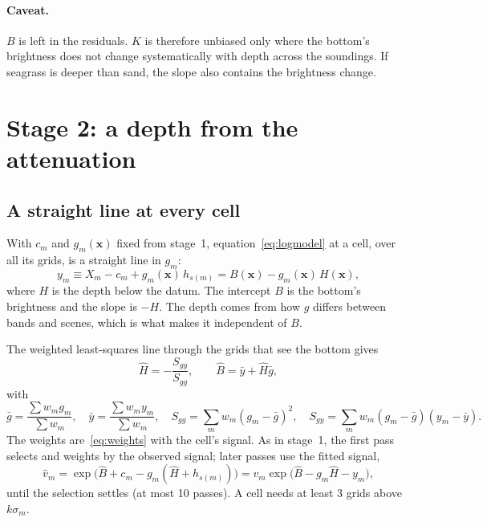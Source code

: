 \documentclass[11pt]{article}
\numberwithin{equation}{section}
\newcommand{\bx}{\mathbf{x}}
\begin{document}
\paragraph{Caveat.} $B$ is left in the residuals. $K$ is therefore unbiased only where the bottom's
brightness does not change systematically with depth across the soundings. If seagrass is
deeper than sand, the slope also contains the brightness change.

\section{Stage 2: a depth from the attenuation}
\label{sec:stage2}

\subsection{A straight line at every cell}

With $c_m$ and $g_m(\bx)$ fixed from stage~1, equation~\eqref{eq:logmodel} at a cell, over all its
grids, is a straight line in $g_m$:
\begin{equation}
  y_m \equiv X_m - c_m + g_m(\bx)\, h_{s(m)} = B(\bx) - g_m(\bx)\, H(\bx) ,
  \label{eq:stage2}
\end{equation}
where $H$ is the depth below the datum. The intercept $B$ is the bottom's brightness and the
slope is $-H$. The depth comes from how $g$ differs between bands and scenes, which is what makes
it independent of $B$.

The weighted least-squares line through the grids that see the bottom gives
\begin{equation}
  \hat H = -\frac{S_{gy}}{S_{gg}}, \qquad \hat B = \bar y + \hat H \bar g ,
\end{equation}
with
\begin{equation}
  \bar g = \frac{\sum w_m g_m}{\sum w_m}, \quad
  \bar y = \frac{\sum w_m y_m}{\sum w_m}, \quad
  S_{gg} = \sum_m w_m (g_m - \bar g)^2, \quad
  S_{gy} = \sum_m w_m (g_m - \bar g)(y_m - \bar y).
\end{equation}
The weights are~\eqref{eq:weights} with the cell's signal. As in stage~1, the first pass selects
and weights by the observed signal; later passes use the fitted signal,
\begin{equation}
  \hat v_m = \exp\bigl(\hat B + c_m - g_m(\hat H + h_{s(m)})\bigr) = v_m \exp\bigl(\hat B - g_m \hat H - y_m\bigr),
\end{equation}
until the selection settles (at most 10 passes). A cell needs at least 3 grids above
$k\sigma_m$.
\end{document}
